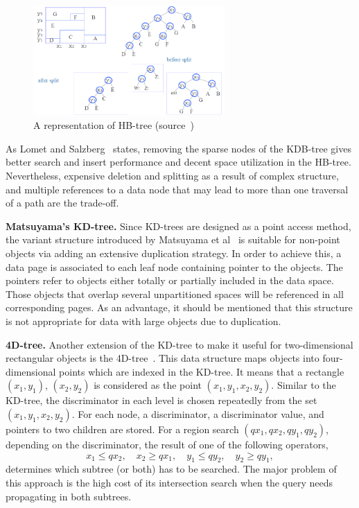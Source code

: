 \documentclass[a4paper,12pt]{article}
\begin{document}
\begin{figure}
\centering
\includegraphics[width=0.65\textwidth,height=0.2\textheight]{hbtree}
\caption{A representation of HB-tree (source~\cite{hbtree1})}
\label{fighbtree}
\end{figure}

As Lomet and Salzberg~\cite{hbtree1} states, removing the sparse nodes of the KDB-tree gives better search and insert performance and decent space utilization in the HB-tree. Nevertheless, expensive deletion and splitting as a result of complex structure, and multiple references to a data node that may lead to more than one traversal of a path are the trade-off.

\textbf{Matsuyama's KD-tree.} Since KD-trees are designed as a point access method, the variant structure introduced by Matsuyama et al~\cite{matsuyama} is suitable for non-point objects via adding an extensive duplication strategy. In order to achieve this, a data page is associated to each leaf node containing pointer to the objects. The pointers refer to objects either totally or partially included in the data space. Those objects that overlap several unpartitioned spaces will be referenced in all corresponding pages. As an advantage, it should be mentioned that this structure is not appropriate for data with large objects due to duplication.

\textbf{4D-tree.} Another extension of the KD-tree to make it useful for two-dimensional rectangular objects is the 4D-tree~\cite{4dtree}. This data structure maps objects into four-dimensional points which are indexed in the KD-tree. It means that a rectangle $(x‍‍_1, y_1)$, $(x_2, y_2)$ is considered as the point $(x‍‍_1, y_1, x_2, y_2)$. Similar to the KD-tree, the discriminator in each level is chosen repeatedly from the set $(x‍‍_1, y_1, x_2, y_2)$. For each node, a discriminator, a discriminator value, and pointers to two children are stored. 
For a region search $(qx_1, qx_2, qy_1, qy_2)$, depending on the discriminator, the result of one of the following operators,
$$x_1 \leq qx_2, \quad x_2 \geq qx_1, \quad y_1 \leq qy_2, \quad y_2 \geq qy_1,$$ 
determines which subtree (or both) has to be searched.
The major problem of this approach is the high cost of its intersection search when the query needs propagating in both subtrees. 
\end{document}
